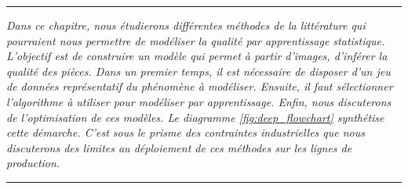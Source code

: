 %
%


\vspace{-5mm}
\begin{center}
	\rule{0.7\linewidth}{.5pt}
	\begin{minipage}{0.7\linewidth}
		\smallskip
		
		\textit{
			Dans ce chapitre, nous étudierons différentes méthodes de la littérature qui pourraient nous permettre de modéliser la qualité par apprentissage statistique.
			L'objectif est de construire un modèle qui permet à partir d'images, d'inférer la qualité des pièces.
			Dans un premier temps, il est nécessaire de disposer d'un jeu de données représentatif du phénomène à modéliser.
			Ensuite, il faut sélectionner l'algorithme à utiliser pour modéliser par apprentissage.
			Enfin, nous discuterons de l'optimisation de ces modèles.
			Le diagramme \ref{fig:deep_flowchart} synthétise cette démarche.
			C'est sous le prisme des contraintes industrielles que nous discuterons des limites au déploiement de ces méthodes sur les lignes de production.
		}
		
	\end{minipage}
	\smallskip
	\rule{0.7\linewidth}{.5pt}
\end{center}
\vspace{-3mm}

\minitoc

\newpage
\null
\vfill

